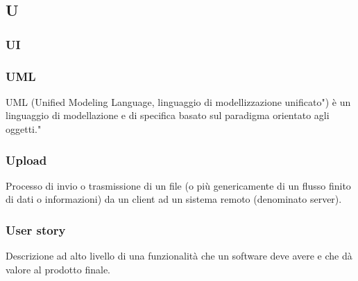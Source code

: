 \subsection*{\textbf{\hfill \Huge{U} \hfill}} 
\subsubsection*{UI}

\subsubsection*{UML}
UML (Unified Modeling Language, linguaggio di modellizzazione unificato") è un linguaggio di modellazione e di specifica basato sul paradigma orientato agli oggetti."
\subsubsection*{Upload}
Processo di invio o trasmissione di un file (o più genericamente di un flusso finito di dati o informazioni) da un client ad un sistema remoto (denominato server).
\subsubsection*{User story}
Descrizione ad alto livello di una funzionalità che un software deve avere e che dà valore al prodotto finale.
